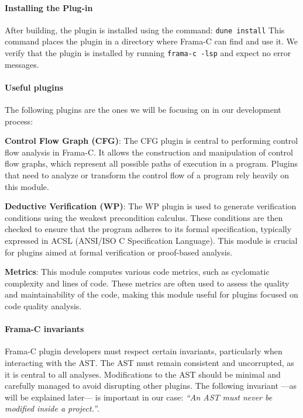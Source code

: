 \documentclass[10pt]{article}
\begin{document}
\begin{singlespace}
\paragraph*{Installing the Plug-in}
After building, the plugin is installed using the command: \texttt{dune install}
This command places the plugin in a directory where Frama-C can find and use it. We verify that the plugin is installed by running \texttt{frama-c -lsp} and expect no error messages.




\paragraph*{Useful plugins}
The following plugins are the ones we will be focusing on in our development process:

\textbf{Control Flow Graph (CFG)}: The CFG plugin is central to performing control flow analysis in Frama-C. It allows the construction and manipulation of control flow graphs, which represent all possible paths of execution in a program. Plugins that need to analyze or transform the control flow of a program rely heavily on this module.

\textbf{Deductive Verification (WP)}: The WP plugin is used to generate verification conditions using the weakest precondition calculus. These conditions are then checked to ensure that the program adheres to its formal specification, typically expressed in ACSL (ANSI/ISO C Specification Language). This module is crucial for plugins aimed at formal verification or proof-based analysis.

\textbf{Metrics}: This module computes various code metrics, such as cyclomatic complexity and lines of code. These metrics are often used to assess the quality and maintainability of the code, making this module useful for plugins focused on code quality analysis.

\paragraph*{Frama-C invariants}
\label{sec:framac-inv}
Frama-C plugin developers must respect certain invariants, particularly when interacting with the AST. The AST must remain consistent and uncorrupted, as it is central to all analyses. Modifications to the AST should be minimal and carefully managed to avoid disrupting other plugins. 
The following invariant ---as will be explained later--- is important in our case: \textit{``An AST must never be modified inside a project.''}. 


\end{singlespace}
\end{document}
